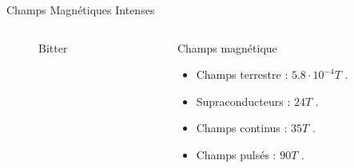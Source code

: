 \begin{frame}{Champs Magn\'etiques Intenses}
\begin{columns}[c]
\begin{column}{3.4cm}
\begin{figure}[H]
    \caption{Bitter}
  \end{figure}
 \end{column}
 \begin{column}{4.6cm}
  \begin{block}{\begin{small} Champs magnétique \end{small}}
   \begin{small}
   \begin{itemize}
    \item Champs terrestre : $5.8 \cdot 10^{-4} T$ .
    \item Supraconducteurs : $24 T$ .
    \item \textcolor{red!80}{Champs continus : $35 T$  .}
    \item Champs pulsés : $90 T$ .
   \end{itemize}
  \end{small}
  \end{block}

 \end{column}
\end{columns}

\end{frame}

